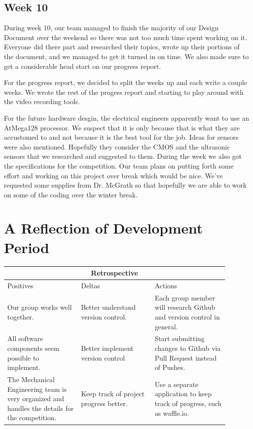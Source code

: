 \documentclass[10pt,letterpaper,onecolumn,draftclsnofoot,journal]{IEEEtran}
\begin{document}
\subsection{Week 10}
During week 10, our team managed to finish the majority of our Design Document over the weekend so there was not too much time spent working on it. Everyone did there part and researched their topics, wrote up their portions of the document, and we managed to get it turned in on time. We also made sure to get a considerable head start on our progress report.\vspace{.3cm} 
\par
For the progress report, we decided to split the weeks up and each write a couple weeks. We wrote the rest of the progess report and starting to play around with the video recording tools.\vspace{.3cm}
\par
For the future hardware desgin, the electrical engineers apparently want to use an AtMega128 processor. We suspect that it is only because that is what they are accustomed to and not because it is the best tool for the job. Ideas for sensors were also mentioned. Hopefully they consider the CMOS and the ultrasonic sensors that we researched and suggested to them. During the week we also got the specifications for the competition. Our team plans on putting forth some effort and working on this project over break which would be nice. We've requested some supplies from Dr. McGrath so that hopefully we are able to work on some of the coding over the winter break.\vspace{.3cm} 
\par

\section{A Reflection of Development Period}
\begin{tabular}{ |p{0.3\linewidth}|p{0.3\linewidth}|p{0.3\linewidth}|  }
\hline
\multicolumn{3}{|c|}{Retrospective} \\
\hline
Positives& Deltas &Actions \\
\hline
Our group works well together. &
Better understand version control.&
Each group member will research Github and version control in general. \\

All software components seem possible to implement. &
Better implement version control &
Start submitting changes to Github via Pull Request instead of Pushes. \\

The Mechanical Engineering team is very organized and handles the details for the competition. &
Keep track of project progress better. & Use a separate application to keep track of progress, such as waffle.io.  \\
\hline
\end{tabular}
\end{document}
